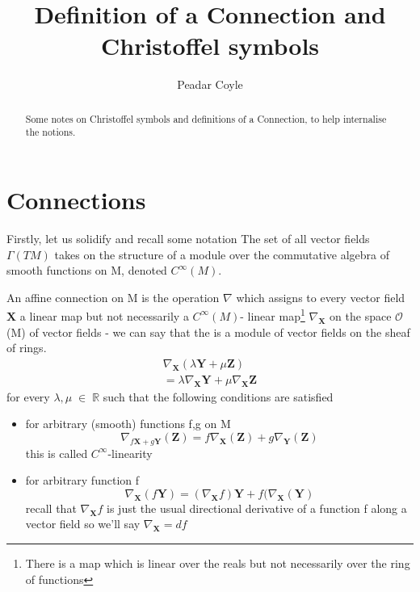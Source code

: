 \documentclass[a4paper,10pt]{article}
\title{Definition of a Connection and Christoffel symbols}
\author{Peadar Coyle}
\newenvironment{definition}[1][Definition]{\begin{trivlist}
\item[\hskip \labelsep {\bfseries #1}]}{\end{trivlist}}
\begin{document}
\maketitle

\begin{abstract}
Some notes on Christoffel symbols and definitions of a Connection, to help internalise the notions.
\end{abstract}
\section{Connections}
Firstly, let us solidify and recall some notation
The set of all vector fields $\Gamma(TM)$ takes on the structure of a module over the 
commutative algebra of smooth functions on M, denoted $C^{\infty}(M)$.
\begin{definition}
 An affine connection on M is the operation $\nabla$ which assigns to every vector field $\mathbf{X}$ a linear
 map but not necessarily a $C^{\infty}(M)$- linear map\footnote{There is a map which is linear over the reals but not necessarily
 over the ring of functions}
 $\nabla_{\mathbf{X}}$ on the space $\mathcal{O}$(M) of vector fields - we can say that the is a module of vector fields
 on the sheaf of rings. 
\begin{eqnarray}
 \nabla_{\mathbf{X}}(\lambda \mathbf{Y} + \mu \mathbf{Z}) \\
 = \lambda \nabla_{\mathbf{X}} \mathbf{Y} + \mu \nabla_{\mathbf{X}} \mathbf{Z}
\end{eqnarray}
for every $\lambda, \mu\;\in\;\mathbb{R}$
such that the following conditions are satisfied 
\begin{itemize}
 \item for arbitrary (smooth) functions f,g on M 
 \begin{equation}\label{2.4}
  \nabla_{f\mathbf{X} + g\mathbf{Y}}(\mathbf{Z}) = f \nabla_{\mathbf{X}}(\mathbf{Z}) 
  +g \nabla_{\mathbf{Y}}(\mathbf{Z})
 \end{equation}
this is called $C^{\infty}$-linearity
\item for arbitrary function f
\begin{equation}\label{2.5}
 \nabla_{\mathbf{X}}(f\mathbf{Y}) = (\nabla_{\mathbf{X}}f)\mathbf{Y} + f(\nabla_{\mathbf{X}}(\mathbf{Y})
\end{equation}
recall that $\nabla_{\mathbf{X}}f$ is just the usual directional derivative of a function f along a vector field
so we'll say $\nabla_{\mathbf{X}} = df$ 
\end{itemize}

\end{definition}
\end{document}
